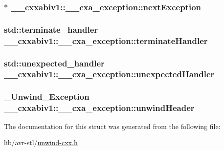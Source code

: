 \hypertarget{struct____cxxabiv1_1_1____cxa__exception_a8e5735018d1716ce01ad2da8ee8b6cd3}{
\subsubsection[{next\-Exception}]{$\ast$ \-\_\-\-\_\-cxxabiv1\-::\-\_\-\-\_\-cxa\-\_\-exception\-::next\-Exception}}\label{struct____cxxabiv1_1_1____cxa__exception_a8e5735018d1716ce01ad2da8ee8b6cd3}
\hypertarget{struct____cxxabiv1_1_1____cxa__exception_a95e8ed26809a82a5b1d404742665f12c}{
\subsubsection[{terminate\-Handler}]{\setlength{\rightskip}{0pt plus 5cm}std\-::terminate\-\_\-handler \-\_\-\-\_\-cxxabiv1\-::\-\_\-\-\_\-cxa\-\_\-exception\-::terminate\-Handler}}\label{struct____cxxabiv1_1_1____cxa__exception_a95e8ed26809a82a5b1d404742665f12c}
\hypertarget{struct____cxxabiv1_1_1____cxa__exception_a54eaa8792b9d70a6fba263bc4098ccde}{
\subsubsection[{unexpected\-Handler}]{\setlength{\rightskip}{0pt plus 5cm}std\-::unexpected\-\_\-handler \-\_\-\-\_\-cxxabiv1\-::\-\_\-\-\_\-cxa\-\_\-exception\-::unexpected\-Handler}}\label{struct____cxxabiv1_1_1____cxa__exception_a54eaa8792b9d70a6fba263bc4098ccde}
\hypertarget{struct____cxxabiv1_1_1____cxa__exception_af6f09c0335f5982eb75942fc2c2abdd4}{
\subsubsection[{unwind\-Header}]{\setlength{\rightskip}{0pt plus 5cm}\-\_\-\-Unwind\-\_\-\-Exception \-\_\-\-\_\-cxxabiv1\-::\-\_\-\-\_\-cxa\-\_\-exception\-::unwind\-Header}}\label{struct____cxxabiv1_1_1____cxa__exception_af6f09c0335f5982eb75942fc2c2abdd4}


The documentation for this struct was generated from the following file\-:\begin{DoxyCompactItemize}
\item 
lib/avr-\/stl/\hyperlink{unwind-cxx_8h}{unwind-\/cxx.\-h}\end{DoxyCompactItemize}
